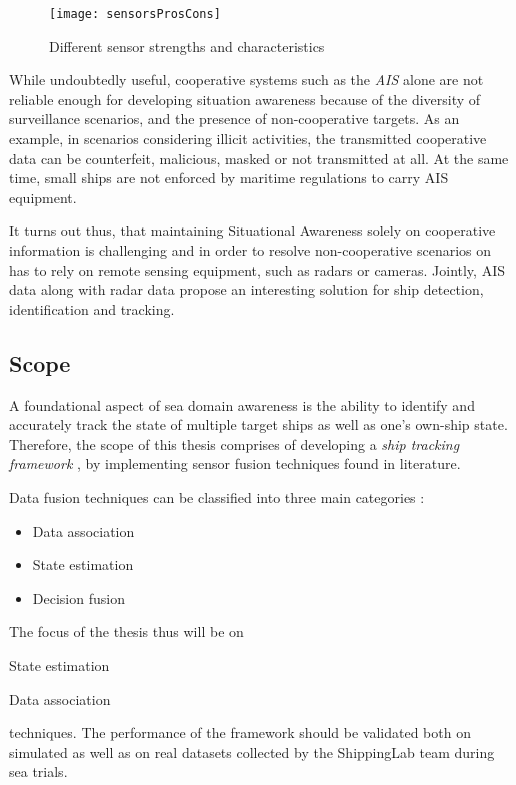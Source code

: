\begin{figure}[H]
	\centering
	\texttt{[image: sensorsProsCons]}
	\caption{Different sensor strengths and characteristics}
	\label{fig:SensorProsCons}
\end{figure}



While undoubtedly useful, cooperative systems such as the \emph{AIS} alone are not reliable enough for developing situation awareness because of the diversity of surveillance scenarios, and the presence of non-cooperative targets. As an example, in scenarios considering illicit activities, the transmitted cooperative data can be counterfeit, malicious, masked or not transmitted at all. At the same time, small ships are not enforced by maritime regulations to carry AIS equipment. 

It turns out thus, that maintaining Situational Awareness solely on cooperative information is challenging and in order to resolve non-cooperative scenarios on has to rely on remote sensing equipment, such as radars or cameras. Jointly, AIS data along with radar data propose an interesting solution for ship detection, identification and tracking.


\subsection{Scope}


A foundational aspect of sea domain awareness is the ability to identify and accurately track the state of multiple target ships as well as one's own-ship state. Therefore, the scope of this thesis comprises of developing a \emph{ship tracking framework} , by implementing sensor fusion techniques found in literature.

Data fusion techniques can be classified into three main categories  \cite{nedo2013}:
\begin{itemize}
	\item Data association
	\item State estimation
	\item Decision fusion
\end{itemize}

 The focus of the thesis thus will be on \begin{mylist}
	\item State estimation
	\item Data association
\end{mylist}
techniques. The performance of the framework should be validated both on simulated as well as on real datasets collected by the ShippingLab team during sea trials.


